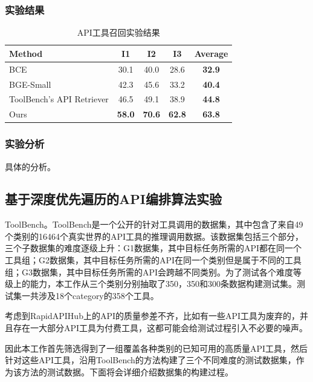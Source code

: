 \subsubsection{实验结果}

\begin{table}[!ht]
  \centering
  \caption{API工具召回实验结果}
  \label{tab:comparison}
  \begin{tabular}{lccc>{\bfseries}c} %
    \toprule
    \textbf{Method} & \textbf{I1} & \textbf{I2} & \textbf{I3} & \textbf{Average} \\ \midrule
    BCE         & 30.1 & 40.0 & 28.6 & 32.9 \\
    BGE-Small         & 42.3 & 45.6 & 33.2 & 40.4 \\
    ToolBench's API Retriever   & 46.5 & 49.1 & 38.9 & 44.8 \\
    Ours        & \textbf{58.0} & \textbf{70.6} & \textbf{62.8} & \textbf{63.8} \\ \bottomrule
  \end{tabular}
\end{table}

\subsubsection{实验分析}

具体的分析。

\subsection{基于深度优先遍历的API编排算法实验}
\label{subsec:test_dataset}

ToolBench。ToolBench\cite{Qin2023}是一个公开的针对工具调用的数据集，其中包含了来自49个类别的16464个真实世界的API工具的推理调用数据。该数据集包括三个部分，三个子数据集的难度逐级上升：G1数据集，其中目标任务所需的API都在同一个工具组；G2数据集，其中目标任务所需的API在同一个类别但是属于不同的工具组；G3数据集，其中目标任务所需的API会跨越不同类别。为了测试各个难度等级上的能力，本工作从三个类别分别抽取了350，350和300条数据构建测试集。测试集一共涉及18个category的358个工具。

考虑到RapidAPIHub上的API的质量参差不齐，比如有一些API工具为废弃的，并且存在一大部分API工具为付费工具，这都可能会给测试过程引入不必要的噪声。

因此本工作首先筛选得到了一组覆盖各种类别的已知可用的高质量API工具，然后针对这些API工具，沿用ToolBench的方法构建了三个不同难度的测试数据集，作为该方法的测试数据。下面将会详细介绍数据集的构建过程。

